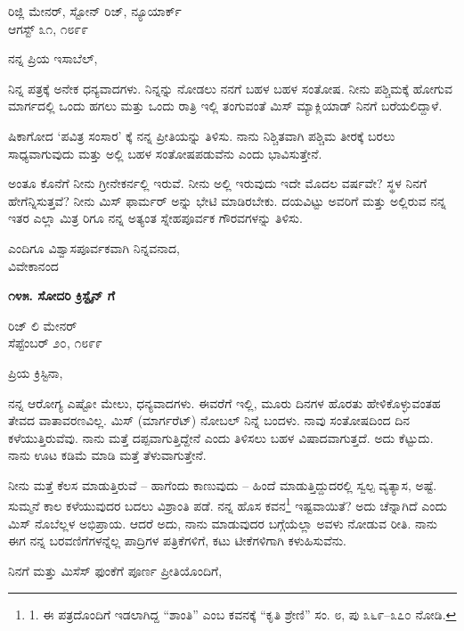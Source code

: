 \begin{flushright}
ರಿಜ್ಲಿ ಮೇನರ್, ಸ್ಟೋನ್ ರಿಜ್, ನ್ಯೂಯಾರ್ಕ್\\ಆಗಸ್ಟ್ ೩೧, ೧೮೯೯
\end{flushright}

ನನ್ನ ಪ್ರಿಯ ಇಸಾಬೆಲ್,

ನಿನ್ನ ಪತ್ರಕ್ಕೆ ಅನೇಕ ಧನ್ಯವಾದಗಳು. ನಿನ್ನನ್ನು ನೋಡಲು ನನಗೆ ಬಹಳ ಬಹಳ ಸಂತೋಷ. ನೀನು ಪಶ್ಚಿಮಕ್ಕೆ ಹೋಗುವ ಮಾರ್ಗದಲ್ಲಿ ಒಂದು ಹಗಲು ಮತ್ತು ಒಂದು ರಾತ್ರಿ ಇಲ್ಲಿ ತಂಗುವಂತೆ ಮಿಸ್ ಮ್ಯಾಕ್ಲಿಯಾಡ್ ನಿನಗೆ ಬರೆಯಲಿದ್ದಾಳೆ.

ಷಿಕಾಗೋದ ‘ಪವಿತ್ರ ಸಂಸಾರ’ ಕ್ಕೆ ನನ್ನ ಪ್ರೀತಿಯನ್ನು ತಿಳಿಸು. ನಾನು ನಿಶ್ಚಿತವಾಗಿ ಪಶ್ಚಿಮ ತೀರಕ್ಕೆ ಬರಲು ಸಾಧ್ಯವಾಗುವುದು ಮತ್ತು ಅಲ್ಲಿ ಬಹಳ ಸಂತೋಷಪಡುವೆನು ಎಂದು ಭಾವಿಸುತ್ತೇನೆ.

ಅಂತೂ ಕೊನೆಗೆ ನೀನು ಗ್ರೀನೇಕರ್ನಲ್ಲಿ ಇರುವೆ. ನೀನು ಅಲ್ಲಿ ಇರುವುದು ಇದೇ ಮೊದಲ ವರ್ಷವೇ? ಸ್ಥಳ ನಿನಗೆ ಹೇಗೆನ್ನಿಸುತ್ತವೆ? ನೀನು ಮಿಸ್ ಫಾರ್ಮರ್ ಅನ್ನು ಭೇಟಿ ಮಾಡಿರಬೇಕು. ದಯವಿಟ್ಟು ಅವರಿಗೆ ಮತ್ತು ಅಲ್ಲಿರುವ ನನ್ನ ಇತರ ಎಲ್ಲಾ ಮಿತ್ರ ರಿಗೂ ನನ್ನ ಅತ್ಯಂತ ಸ್ನೇಹಪೂರ್ವಕ ಗೌರವಗಳನ್ನು ತಿಳಿಸು.

\begin{flushright}
ಎಂದಿಗೂ ವಿಶ್ವಾಸಪೂರ್ವಕವಾಗಿ ನಿನ್ನವನಾದ,\\ವಿವೇಕಾನಂದ
\end{flushright}

\begin{center}
\textbf{೧೪೫. ಸೋದರಿ ಕ್ರಿಸ್ಟೈನ್ ಗೆ}
\end{center}

\begin{flushright}
ರಿಜ್ ಲಿ ಮೇನರ್\\ಸೆಪ್ಟೆಂಬರ್ ೨೦, ೧೮೯೯
\end{flushright}

ಪ್ರಿಯ ಕ್ರಿಸ್ಟಿನಾ,

ನನ್ನ ಆರೋಗ್ಯ ಎಷ್ಟೋ ಮೇಲು, ಧನ್ಯವಾದಗಳು. ಈವರೆಗೆ ಇಲ್ಲಿ, ಮೂರು ದಿನಗಳ ಹೊರತು ಹೇಳಿಕೊಳ್ಳುವಂತಹ ತೇವದ ವಾತಾವರಣವಿಲ್ಲ. ಮಿಸ್ (ಮಾರ್ಗರೆಟ್) ನೋಬಲ್ ನಿನ್ನೆ ಬಂದಳು. ನಾವು ಸಂತೋಷದಿಂದ ದಿನ ಕಳೆಯುತ್ತಿರುವೆವು. ನಾನು ಮತ್ತೆ ದಪ್ಪವಾಗುತ್ತಿದ್ದೇನೆ ಎಂದು ತಿಳಿಸಲು ಬಹಳ ವಿಷಾದವಾಗುತ್ತದೆ. ಅದು ಕೆಟ್ಟುದು. ನಾನು ಊಟ ಕಡಿಮೆ ಮಾಡಿ ಮತ್ತೆ ತೆಳುವಾಗುತ್ತೇನೆ.

ನೀನು ಮತ್ತೆ ಕೆಲಸ ಮಾಡುತ್ತಿರುವೆ – ಹಾಗೆಂದು ಕಾಣುವುದು – ಹಿಂದೆ ಮಾಡುತ್ತಿದ್ದುದರಲ್ಲಿ ಸ್ವಲ್ಪ ವ್ಯತ್ಯಾಸ, ಅಷ್ಟೆ. ಸುಮ್ಮನೆ ಕಾಲ ಕಳೆಯುವುದರ ಬದಲು ವಿಶ್ರಾಂತಿ ಪಡೆ. ನನ್ನ ಹೊಸ ಕವನ\footnote{1. ಈ ಪತ್ರದೊಂದಿಗೆ ಇಡಲಾಗಿದ್ದ “ಶಾಂತಿ” ಎಂಬ ಕವನಕ್ಕೆ “ಕೃತಿ ಶ್ರೇಣಿ” ಸಂ. ೮, ಪು ೩೬೯–೩೭೦ ನೋಡಿ.} ಇಷ್ಟವಾಯಿತೆ? ಅದು ಚೆನ್ನಾಗಿದೆ ಎಂದು ಮಿಸ್ ನೊಬೆಲ್ಲಳ ಅಭಿಪ್ರಾಯ. ಆದರೆ ಅದು, ನಾನು ಮಾಡುವುದರ ಬಗ್ಗೆಯೆಲ್ಲಾ ಅವಳು ನೋಡುವ ರೀತಿ. ನಾನು ಈಗ ನನ್ನ ಬರವಣಿಗೆಗಳನ್ನೆಲ್ಲ ಪಾದ್ರಿಗಳ ಪತ್ರಿಕೆಗಳಿಗೆ, ಕಟು ಟೀಕೆಗಳಿಗಾಗಿ ಕಳುಹಿಸುವೆನು.

ನಿನಗೆ ಮತ್ತು ಮಿಸೆಸ್ ಫುಂಕೆಗೆ ಪೂರ್ಣ ಪ್ರೀತಿಯೊಂದಿಗೆ,

